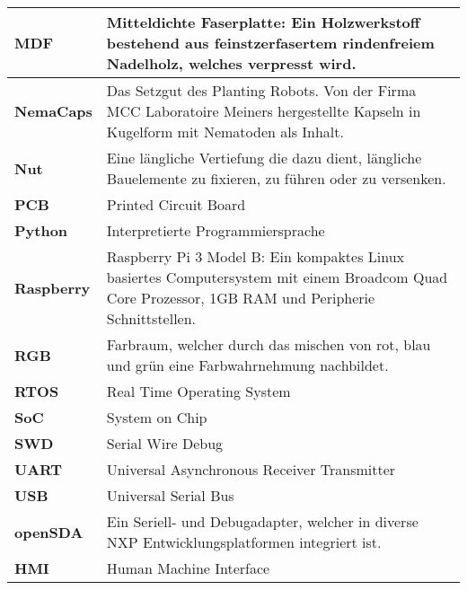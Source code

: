 \begin{table}[H]
\begin{tabular}{|L{2.9cm}|L{12.6cm}|}
		\hline
		\textbf{MDF} &  Mitteldichte Faserplatte: Ein Holzwerkstoff bestehend aus feinstzerfasertem rindenfreiem Nadelholz, welches verpresst wird.  \\		

		\hline
		\textbf{NemaCaps} &  Das Setzgut des Planting Robots. Von der Firma MCC Laboratoire Meiners hergestellte Kapseln in Kugelform mit Nematoden als Inhalt. \\

		\hline
		\textbf{Nut} &  Eine längliche Vertiefung die dazu dient,  längliche Bauelemente zu fixieren, zu führen oder zu versenken.\\	
		
	 	\hline
	 	\textbf{PCB} &	Printed Circuit Board\\
		
		\hline
		\textbf{Python} & Interpretierte Programmiersprache \\

		\hline		
		\textbf{Raspberry} & Raspberry Pi 3 Model B: Ein kompaktes Linux basiertes Computersystem mit einem Broadcom Quad Core Prozessor, 1GB RAM und Peripherie Schnittstellen. \\	

		\hline
		\textbf{RGB} &  Farbraum, welcher durch das mischen von rot, blau und grün eine Farbwahrnehmung nachbildet. \\

		
		\hline
		\textbf{RTOS} & Real Time Operating System \\
		
		\hline
		\textbf{SoC} &	System on Chip\\
		
		\hline
		\textbf{SWD} &	Serial Wire Debug\\
		
		\hline
		\textbf{UART} &	Universal Asynchronous Receiver Transmitter\\
		
		\hline
		\textbf{USB} &	Universal Serial Bus\\		
		
		\hline
		\textbf{openSDA} & Ein Seriell- und Debugadapter, welcher in diverse NXP Entwicklungsplatformen integriert ist.\\
		
		\hline
		\textbf{HMI} & Human Machine Interface\\
				
		\hline
	\end{tabular} 
\end{table}


